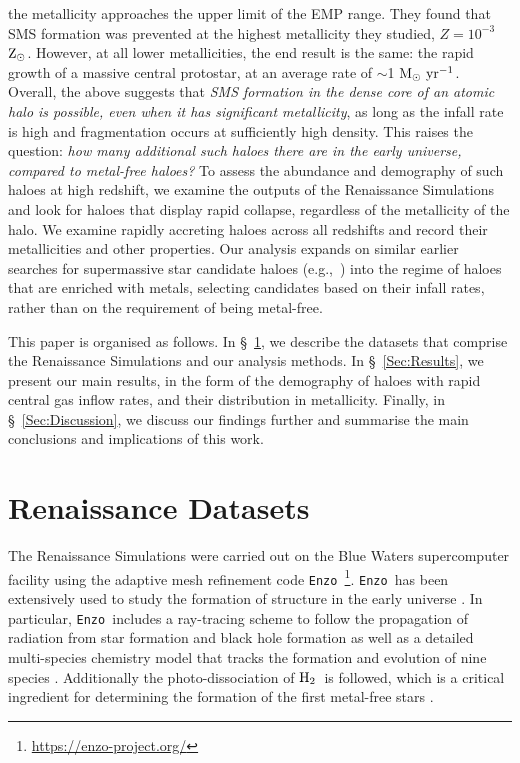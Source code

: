 \documentclass[twocolumn,iop,revtex4]{openjournal}
\newcommand{\enzo}{\texttt{Enzo~}}
\newcommand{\msolaryrc} {$\rm{M_{\odot}~yr^{-1}}$}
\newcommand{\zsolarc} {$\rm{Z_{\odot}}$}
\newcommand{\molH} {$\rm{H_2}$~}
\begin{document}
  the metallicity approaches the upper limit of the EMP range. They found that SMS formation was
  prevented at the highest metallicity they studied, $Z=10^{-3}$ \zsolarc. However, at all
  lower metallicities, the end result is the same: the rapid growth of a massive central protostar,
  at an average rate of $\sim$1 \msolaryrc.\\
  \indent Overall, the above suggests that {\em SMS formation in the dense core of an atomic halo is possible,
    even when it has significant metallicity}, as long as the infall rate is high and fragmentation occurs at sufficiently high density.
This raises the question: {\em how many additional such haloes there are in the early universe, compared to metal-free haloes?}
To assess the abundance and demography of such haloes at high redshift, we examine the outputs of the Renaissance Simulations
and look for haloes that display rapid collapse, regardless of the metallicity of the halo.
We examine rapidly accreting haloes across all redshifts and record their metallicities and other properties.
Our analysis expands on similar earlier searches for supermassive star candidate haloes
(e.g.,~\citealt{Habouzit_2016,Tremmel_2017,Dunn_2018,Wise_2019,Regan_2020}) into the regime of haloes that are enriched with
metals, selecting candidates based on their infall rates, rather than on the requirement of being metal-free.

This paper is organised as follows.
In \S~\ref{Sec:RenaissanceDatasets}, we describe the datasets that comprise the Renaissance Simulations
and our analysis methods.
In \S~\ref{Sec:Results}, we present  our main results, in the form of the demography of
haloes with rapid central gas inflow rates, and their distribution in metallicity.  
Finally, in \S~\ref{Sec:Discussion}, 
we discuss our findings further and summarise the main conclusions and implications of this work.

\section{Renaissance Datasets} \label{Sec:RenaissanceDatasets}
The Renaissance Simulations were carried out on the Blue Waters supercomputer facility using the
adaptive mesh refinement code \enzo\citep{Enzo_2014, Enzo_2019}\footnote{\url{https://enzo-project.org/}}.
\enzo has been extensively used to study the formation of structure in the early universe
\citep{Abel_2002, OShea_2005b, Turk_2012, Wise_2012b, Wise_2014, Regan_2015, Regan_2017}. In
particular, \enzo includes a ray-tracing scheme to follow the propagation of radiation from star
formation and
black hole formation \citep{WiseAbel_2011} as well as a detailed multi-species chemistry model that
tracks the formation and evolution of nine species \citep{Anninos_1997, Abel_1997, Grackle}.
Additionally the photo-dissociation of \molH is followed, which is a critical ingredient for
determining the formation of the first metal-free stars \citep{Haiman_2000}.
\end{document}

